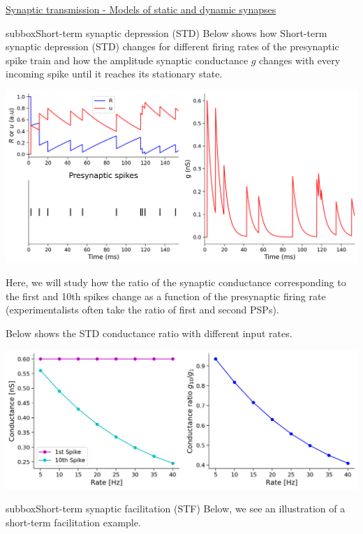 \begin{textbox}{\href{https://compneuro.neuromatch.io/tutorials/W2D3_BiologicalNeuronModels/student/W2D3_Tutorial3.html}{Synaptic transmission - Models of static and dynamic synapses } }
\begin{subbox}{subbox}{Short-term synaptic depression (STD)}
\scriptsize
Below shows how Short-term synaptic depression (STD) changes for different firing rates of the presynaptic spike train and how the amplitude synaptic conductance $g$ changes with every incoming spike until it reaches its stationary state. 
\begin{center}
    
\includegraphics[scale=0.14]{Figures/BNM/LIF_Figure10.png}
\end{center}

Here, we will study how the ratio of the synaptic conductance corresponding to the first and 10th spikes change as a function of the presynaptic firing rate (experimentalists often take the ratio of first and second PSPs).

Below shows the STD conductance ratio with different input rates.
\begin{center}
    
\includegraphics[scale=0.14]{Figures/BNM/LIF_Figure11.png}
\end{center}

\end{subbox}
\begin{subbox}{subbox}{Short-term synaptic facilitation (STF)}
\scriptsize
Below, we see an illustration of a short-term facilitation example. 


\end{subbox}
\end{textbox}
